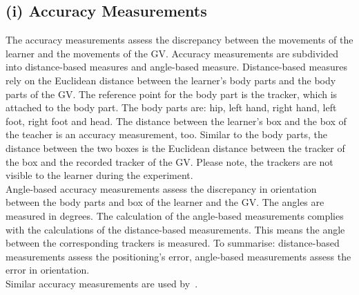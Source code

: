 \subsection{(i) Accuracy Measurements}
The accuracy measurements assess the discrepancy between the movements of the learner and the movements of the GV. Accuracy measurements are subdivided into distance-based measures and angle-based measure. Distance-based measures rely on the Euclidean distance between the learner's body parts and the body parts of the GV. The reference point for the body part is the tracker, which is attached to the body part. The body parts are: hip, left hand, right hand, left foot, right foot and head. The distance between the learner's box and the box of the teacher is an accuracy measurement, too. Similar to the body parts, the distance between the two boxes is the Euclidean distance between the tracker of the box and the recorded tracker of the GV. Please note, the trackers are not visible to the learner during the experiment.\\
Angle-based accuracy measurements assess the discrepancy in orientation between the body parts and box of the learner and the GV. The angles are measured in degrees. The calculation of the angle-based measurements complies with the calculations of the distance-based measurements. This means the angle between the corresponding trackers is measured. To summarise: distance-based measurements assess the positioning's error, angle-based measurements assess the error in orientation.\\

Similar accuracy measurements are used by~\cite{onebody,thaichichua,YouMove,physioathome,vrdancetrainer,lightguide}.


